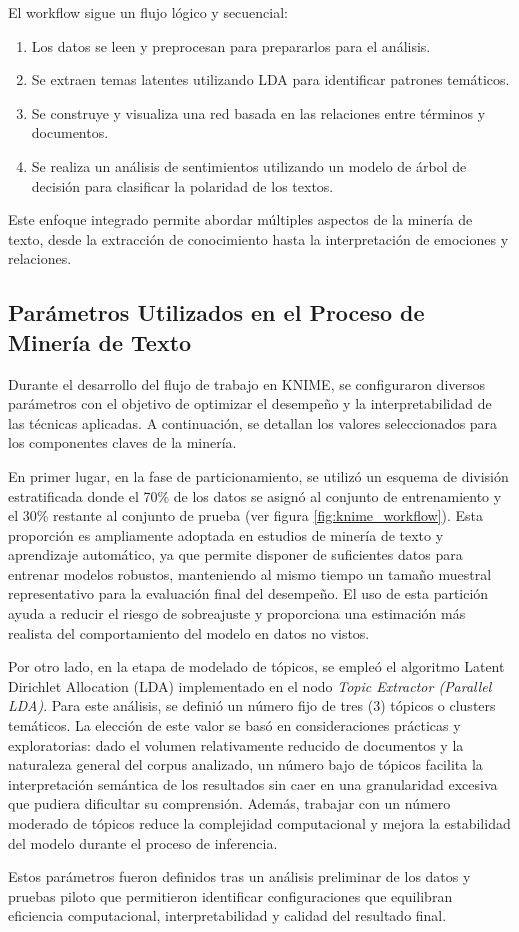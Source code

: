 El workflow sigue un flujo lógico y secuencial:
\begin{enumerate}
	\item Los datos se leen y preprocesan para prepararlos para el análisis.
	
	\item Se extraen temas latentes utilizando LDA para identificar patrones temáticos.
	
	\item Se construye y visualiza una red basada en las relaciones entre términos y documentos.
	
	\item Se realiza un análisis de sentimientos utilizando un modelo de árbol de decisión para clasificar la polaridad de los textos.
\end{enumerate}

Este enfoque integrado permite abordar múltiples aspectos de la minería de texto, desde la extracción de conocimiento hasta la interpretación de emociones y relaciones.

\subsection{Parámetros Utilizados en el Proceso de Minería de Texto}

Durante el desarrollo del flujo de trabajo en KNIME, se configuraron diversos parámetros con el objetivo de optimizar el desempeño y la interpretabilidad de las técnicas aplicadas. A continuación, se detallan los valores seleccionados para los componentes claves de la minería.

En primer lugar, en la fase de particionamiento, se utilizó un esquema de división estratificada donde el 70\% de los datos se asignó al conjunto de entrenamiento y el 30\% restante al conjunto de prueba (ver figura \ref{fig:knime_workflow}). Esta proporción es ampliamente adoptada en estudios de minería de texto y aprendizaje automático, ya que permite disponer de suficientes datos para entrenar modelos robustos, manteniendo al mismo tiempo un tamaño muestral representativo para la evaluación final del desempeño. El uso de esta partición ayuda a reducir el riesgo de sobreajuste y proporciona una estimación más realista del comportamiento del modelo en datos no vistos.

Por otro lado, en la etapa de modelado de tópicos, se empleó el algoritmo Latent Dirichlet Allocation (LDA) implementado en el nodo \textit{Topic Extractor (Parallel LDA)}. Para este análisis, se definió un número fijo de tres (3) tópicos o clusters temáticos. La elección de este valor se basó en consideraciones prácticas y exploratorias: dado el volumen relativamente reducido de documentos y la naturaleza general del corpus analizado, un número bajo de tópicos facilita la interpretación semántica de los resultados sin caer en una granularidad excesiva que pudiera dificultar su comprensión. Además, trabajar con un número moderado de tópicos reduce la complejidad computacional y mejora la estabilidad del modelo durante el proceso de inferencia.

Estos parámetros fueron definidos tras un análisis preliminar de los datos y pruebas piloto que permitieron identificar configuraciones que equilibran eficiencia computacional, interpretabilidad y calidad del resultado final.



